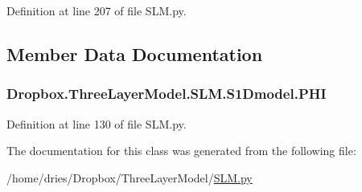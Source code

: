 Definition at line 207 of file S\+L\+M.\+py.



\subsection{Member Data Documentation}
\hypertarget{classDropbox_1_1ThreeLayerModel_1_1SLM_1_1S1Dmodel_ac52d56c2b6c5a74b2f05d248d375ad13}{
\subsubsection[{P\+H\+I}]{\setlength{\rightskip}{0pt plus 5cm}Dropbox.\+Three\+Layer\+Model.\+S\+L\+M.\+S1\+Dmodel.\+P\+H\+I}}\label{classDropbox_1_1ThreeLayerModel_1_1SLM_1_1S1Dmodel_ac52d56c2b6c5a74b2f05d248d375ad13}


Definition at line 130 of file S\+L\+M.\+py.



The documentation for this class was generated from the following file\+:\begin{DoxyCompactItemize}
\item 
/home/dries/\+Dropbox/\+Three\+Layer\+Model/\hyperlink{SLM_8py}{S\+L\+M.\+py}\end{DoxyCompactItemize}
